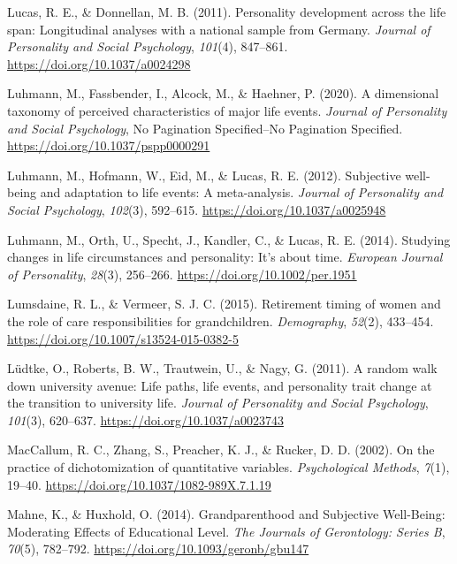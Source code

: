 \documentclass[
  english,
  man, noextraspace]{apa7}
\begin{document}
\leavevmode\hypertarget{ref-lucasPersonalityDevelopmentLife2011}{}%
Lucas, R. E., \& Donnellan, M. B. (2011). Personality development across the life span: Longitudinal analyses with a national sample from Germany. \emph{Journal of Personality and Social Psychology}, \emph{101}(4), 847--861. \url{https://doi.org/10.1037/a0024298}

\leavevmode\hypertarget{ref-luhmannDimensionalTaxonomyPerceived2020}{}%
Luhmann, M., Fassbender, I., Alcock, M., \& Haehner, P. (2020). A dimensional taxonomy of perceived characteristics of major life events. \emph{Journal of Personality and Social Psychology}, No Pagination Specified--No Pagination Specified. \url{https://doi.org/10.1037/pspp0000291}

\leavevmode\hypertarget{ref-luhmannSubjectiveWellbeingAdaptation2012}{}%
Luhmann, M., Hofmann, W., Eid, M., \& Lucas, R. E. (2012). Subjective well-being and adaptation to life events: A meta-analysis. \emph{Journal of Personality and Social Psychology}, \emph{102}(3), 592--615. \url{https://doi.org/10.1037/a0025948}

\leavevmode\hypertarget{ref-luhmannStudyingChangesLife2014}{}%
Luhmann, M., Orth, U., Specht, J., Kandler, C., \& Lucas, R. E. (2014). Studying changes in life circumstances and personality: It's about time. \emph{European Journal of Personality}, \emph{28}(3), 256--266. \url{https://doi.org/10.1002/per.1951}

\leavevmode\hypertarget{ref-lumsdaineRetirementTimingWomen2015}{}%
Lumsdaine, R. L., \& Vermeer, S. J. C. (2015). Retirement timing of women and the role of care responsibilities for grandchildren. \emph{Demography}, \emph{52}(2), 433--454. \url{https://doi.org/10.1007/s13524-015-0382-5}

\leavevmode\hypertarget{ref-ludtkeRandomWalkUniversity2011}{}%
Lüdtke, O., Roberts, B. W., Trautwein, U., \& Nagy, G. (2011). A random walk down university avenue: Life paths, life events, and personality trait change at the transition to university life. \emph{Journal of Personality and Social Psychology}, \emph{101}(3), 620--637. \url{https://doi.org/10.1037/a0023743}

\leavevmode\hypertarget{ref-maccallumPracticeDichotomizationQuantitative2002}{}%
MacCallum, R. C., Zhang, S., Preacher, K. J., \& Rucker, D. D. (2002). On the practice of dichotomization of quantitative variables. \emph{Psychological Methods}, \emph{7}(1), 19--40. \url{https://doi.org/10.1037/1082-989X.7.1.19}

\leavevmode\hypertarget{ref-mahneGrandparenthoodSubjectiveWellBeing2014}{}%
Mahne, K., \& Huxhold, O. (2014). Grandparenthood and Subjective Well-Being: Moderating Effects of Educational Level. \emph{The Journals of Gerontology: Series B}, \emph{70}(5), 782--792. \url{https://doi.org/10.1093/geronb/gbu147}
\end{document}
